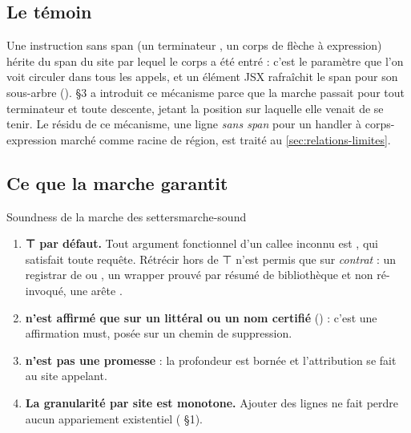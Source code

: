 \subsection{Le témoin}

Une instruction sans span (un terminateur , un corps de flèche à expression) hérite du span du site par lequel le corps a été entré : c'est le paramètre  que l'on voit circuler dans tous les appels, et un élément JSX rafraîchit le span pour son sous-arbre ().  §3 a introduit ce mécanisme parce que la marche passait  pour tout terminateur et toute descente, jetant la position sur laquelle elle venait de se tenir. Le résidu de ce mécanisme, une ligne \emph{sans span} pour un handler à corps-expression marché comme racine de région, est traité au \cref{sec:relations-limites}.

\subsection{Ce que la marche garantit}

\begin{invariant}{Soundness de la marche des setters}{marche-sound}
\begin{enumerate}
  \item \textbf{⊤ par défaut.} Tout argument fonctionnel d'un callee inconnu est , qui satisfait toute requête. Rétrécir hors de ⊤ n'est permis que sur \emph{contrat} : un registrar de   ou , un wrapper prouvé par résumé de bibliothèque et non ré-invoqué, une arête .
  \item \textbf{ n'est affirmé que sur un littéral ou un nom certifié} () : c'est une affirmation must, posée sur un chemin de suppression.
  \item \textbf{ n'est pas une promesse} : la profondeur est bornée et l'attribution se fait au site appelant.
  \item \textbf{La granularité par site est monotone.} Ajouter des lignes ne fait perdre aucun appariement existentiel ( §1).
\end{enumerate}
\end{invariant}

